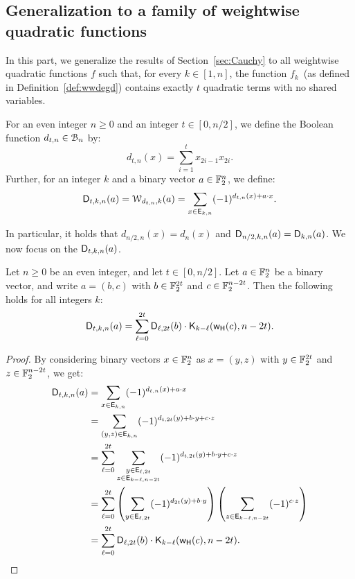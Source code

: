 \documentclass{llncs}
\begin{document}
\subsection{Generalization to a family of weightwise quadratic functions}\label{sec:general}

In this part, we generalize the results of Section~\ref{sec:Cauchy} to all weightwise quadratic functions $f$ such that, for every $k \in [1, n]$, the function $f_k$ (as defined in Definition~\ref{def:wwdegd}) contains exactly $t$ quadratic terms with no shared variables.

\begin{definition}
	For an even integer $n\geq 0$ and an integer $t\in[0,n/2]$, we define the Boolean function $d_{t,n}\in\mathcal{B}_n$ by:
	\[
		d_{t,n}(x)=\sum_{i=1}^t x_{2i-1} x_{2i}.
	\]
	Further, for an integer $k$ and a binary vector $a\in\mathbb{F}_2^n$, we define:
	\[
		\mathsf{D}_{t,k,n}(a)=\mathcal{W}_{d_{t,n},k}(a)=\sum_{x\in \mathsf{E}_{k,n}} (-1)^{d_{t,n}(x) +a\cdot x}.
	\]
\end{definition}

In particular, it holds that $d_{n/2,n}(x)=d_n(x)$ and $\mathsf{D}_{n/2,k,n}(a)=\mathsf{D}_{k,n}(a)$.
We now focus on the $\mathsf{D}_{t,k,n}(a)$.

\begin{proposition}\label{proposition:dtn}
    Let $n\geq 0$ be an even integer, and let $t\in[0,n/2]$. Let $a\in\mathbb{F}_2^n$ be a binary vector, and write $a=(b,c)$ with $b\in\mathbb{F}_2^{2t}$ and $c\in\mathbb{F}_2^{n-2t}$. Then the following holds for all integers $k$:
	\[
		\mathsf{D}_{t,k,n}(a)=\sum_{\ell=0}^{2t} \mathsf{D}_{\ell,2t}(b)\cdot\mathsf{K}_{k-\ell}(\mathsf{w_H}(c),n-2t).
	\]
\end{proposition}

\begin{proof}
    By considering binary vectors $x\in\mathbb{F}_2^n$ as $x=(y,z)$ with $y\in\mathbb{F}_2^{2t}$ and $z\in\mathbb{F}_2^{n-2t}$, we get:	
	\begin{align*}
		\mathsf{D}_{t,k,n}(a)&=\sum_{x \in \mathsf{E}_{k,n}} (-1)^{d_{t,n}(x)+a \cdot x}\\
		&=\sum_{(y,z)\in\mathsf{E}_{k,n}} (-1)^{d_{t,2t}(y)+b \cdot y +c \cdot z}\\
		&=\sum_{\ell=0}^{2t} \sum_{\substack{y \in \mathsf{E}_{\ell,2t}\\z \in \mathsf{E}_{k-\ell,n-2t}}} (-1)^{d_{t,2t}(y)+b \cdot y +c \cdot z}\\
		&=\sum_{\ell=0}^{2t}\left(\sum_{y \in \mathsf{E}_{\ell,2t}} (-1)^{d_{2t}(y)+b \cdot y}\right)\left( \sum_{z \in \mathsf{E}_{k-\ell,n-2t}} (-1)^{c \cdot z}\right)\\&=\sum_{\ell=0}^{2t} \mathsf{D}_{\ell,2t}(b)\cdot\mathsf{K}_{k-\ell}(\mathsf{w_H}(c),n-2t).\qedhere
	\end{align*}
\end{proof}
\end{document}
